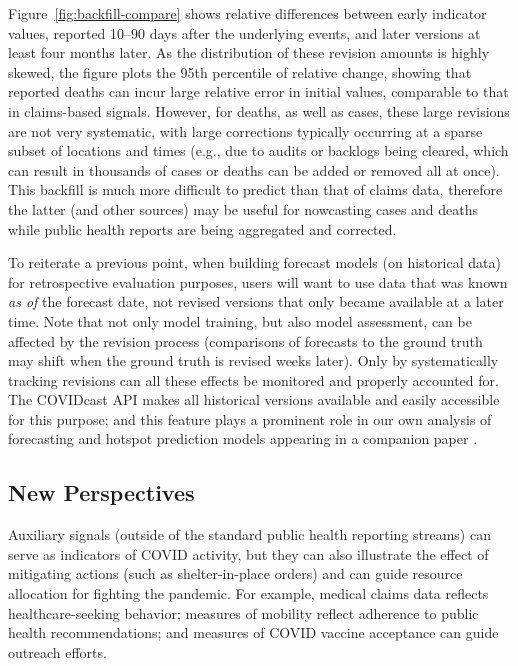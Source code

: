 \documentclass[11pt]{article}
\begin{document}
Figure~\ref{fig:backfill-compare} shows relative differences between early
indicator values, reported 10--90 days after the underlying events, and later
versions at least four months later. As the distribution of these revision
amounts is highly skewed, the figure plots the 95th percentile of relative
change, showing that reported deaths can incur large relative error in initial
values, comparable to that in claims-based signals. However, for deaths, as well
as cases, these large revisions are not very systematic, with large corrections
typically occurring at a sparse subset of locations and times (e.g., due to
audits or backlogs being cleared, which can result in thousands of cases or
deaths can be added or removed all at once). This backfill is much more
difficult to predict than that of claims data, therefore the latter (and other
sources) may be useful for nowcasting cases and deaths while public health
reports are being aggregated and corrected.

To reiterate a previous point, when building forecast models (on historical
data) for retrospective evaluation purposes, users will want to use data that
was known \textit{as of} the forecast date, not revised versions that only
became available at a later time. Note that not only model training, but also
model assessment, can be affected by the revision process (comparisons of
forecasts to the ground truth may shift when the ground truth is revised weeks
later). Only by systematically tracking revisions can all these effects be
monitored and properly accounted for.  The COVIDcast API makes all historical
versions available and easily accessible for this purpose; and this feature
plays a prominent role in our own analysis of forecasting and hotspot prediction
models appearing in a companion paper \cite{McDonald:2021}.

\subsection{New Perspectives}

Auxiliary signals (outside of the standard public health reporting streams) can
serve as indicators of COVID activity, but they can also illustrate the effect
of mitigating actions (such as shelter-in-place orders) and can guide resource
allocation for fighting the pandemic. For example, medical claims data reflects
healthcare-seeking behavior; measures of mobility reflect adherence to public
health recommendations; and measures of COVID vaccine acceptance can guide
outreach efforts.
\end{document}
